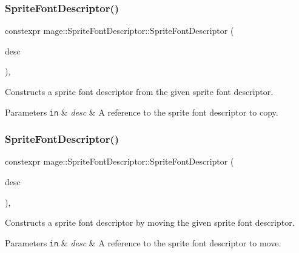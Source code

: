 \subsubsection{\texorpdfstring{Sprite\+Font\+Descriptor()}{SpriteFontDescriptor()}\hspace{0.1cm}{\footnotesize\ttfamily [2/3]}}
{\footnotesize\ttfamily constexpr mage\+::\+Sprite\+Font\+Descriptor\+::\+Sprite\+Font\+Descriptor (\begin{DoxyParamCaption}\item[{const \hyperlink{classmage_1_1_sprite_font_descriptor}{Sprite\+Font\+Descriptor} \&}]{desc }\end{DoxyParamCaption})\hspace{0.3cm}{\ttfamily [default]}, {\ttfamily [noexcept]}}

Constructs a sprite font descriptor from the given sprite font descriptor.


\begin{DoxyParams}[1]{Parameters}
\mbox{\tt in}  & {\em desc} & A reference to the sprite font descriptor to copy. \\
\hline
\end{DoxyParams}
\hypertarget{classmage_1_1_sprite_font_descriptor_ac5dbe0eda36dbb031aed0d12af875ab1}{}\label{classmage_1_1_sprite_font_descriptor_ac5dbe0eda36dbb031aed0d12af875ab1} 
\subsubsection{\texorpdfstring{Sprite\+Font\+Descriptor()}{SpriteFontDescriptor()}\hspace{0.1cm}{\footnotesize\ttfamily [3/3]}}
{\footnotesize\ttfamily constexpr mage\+::\+Sprite\+Font\+Descriptor\+::\+Sprite\+Font\+Descriptor (\begin{DoxyParamCaption}\item[{\hyperlink{classmage_1_1_sprite_font_descriptor}{Sprite\+Font\+Descriptor} \&\&}]{desc }\end{DoxyParamCaption})\hspace{0.3cm}{\ttfamily [default]}, {\ttfamily [noexcept]}}

Constructs a sprite font descriptor by moving the given sprite font descriptor.


\begin{DoxyParams}[1]{Parameters}
\mbox{\tt in}  & {\em desc} & A reference to the sprite font descriptor to move. \\
\hline
\end{DoxyParams}
\hypertarget{classmage_1_1_sprite_font_descriptor_ab259871eed5ca9be3830d7da9cfc7092}{}\label{classmage_1_1_sprite_font_descriptor_ab259871eed5ca9be3830d7da9cfc7092} 
